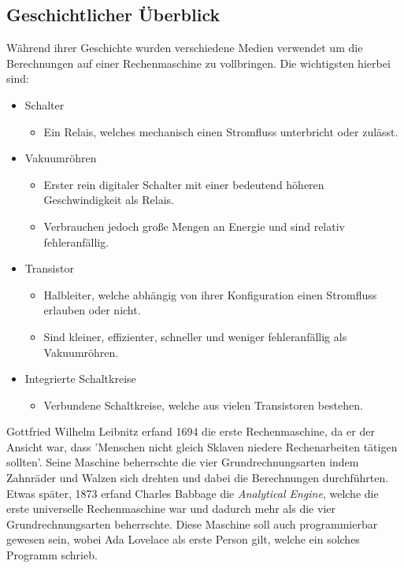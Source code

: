 \documentclass{article}
\begin{document}
	\subsection{Geschichtlicher Überblick}
	Während ihrer Geschichte wurden verschiedene Medien verwendet um die Berechnungen auf einer Rechenmaschine zu vollbringen. Die wichtigsten hierbei sind: 
	\begin{itemize}
		\item{Schalter}
		\begin{itemize}
			\item{Ein Relais, welches mechanisch einen Stromfluss unterbricht oder zulässt.}
		\end{itemize}
		\item{Vakuumröhren}
		\begin{itemize}
			\item{Erster rein digitaler Schalter mit einer bedeutend höheren Geschwindigkeit als Relais.}
			\item{Verbrauchen jedoch große Mengen an Energie und sind relativ fehleranfällig.}
		\end{itemize}
		\item{Transistor}
		\begin{itemize}
			\item{Halbleiter, welche abhängig von ihrer Konfiguration einen Stromfluss erlauben oder nicht.}
			\item{Sind kleiner, effizienter, schneller und weniger fehleranfällig als Vakuumröhren.}
		\end{itemize}
		\item{Integrierte Schaltkreise}
		\begin{itemize}
			\item{Verbundene Schaltkreise, welche aus vielen Transistoren bestehen.}
		\end{itemize}
	\end{itemize}
	Gottfried Wilhelm Leibnitz erfand 1694 die erste Rechenmaschine, da er der Ansicht war, dass 'Menschen nicht gleich Sklaven niedere Rechenarbeiten tätigen sollten'. Seine Maschine beherrschte die vier Grundrechnungsarten indem Zahnräder und Walzen sich drehten und dabei die Berechnungen durchführten. \\
	Etwas später, 1873 erfand Charles Babbage die \textit{Analytical Engine}, welche die erste universelle Rechenmaschine war und dadurch mehr als die vier Grundrechnungsarten beherrschte. Diese Maschine soll auch programmierbar gewesen sein, wobei Ada Lovelace als erste Person gilt, welche ein solches Programm schrieb. \\
\end{document}
